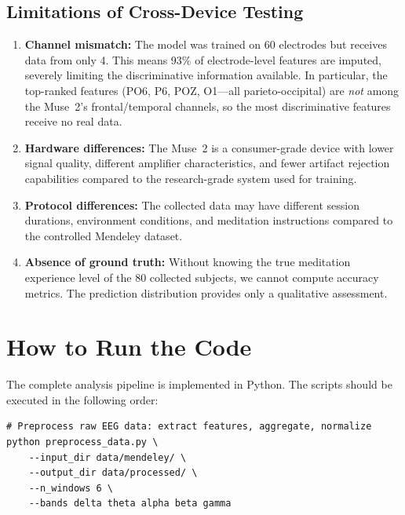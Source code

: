 \documentclass[12pt,a4paper]{article}
\begin{document}
\subsection{Limitations of Cross-Device Testing}

\begin{enumerate}
  \item \textbf{Channel mismatch:} The model was trained on 60 electrodes but receives data from only 4. This means 93\% of electrode-level features are imputed, severely limiting the discriminative information available. In particular, the top-ranked features (PO6, P6, POZ, O1---all parieto-occipital) are \emph{not} among the Muse~2's frontal/temporal channels, so the most discriminative features receive no real data.

  \item \textbf{Hardware differences:} The Muse~2 is a consumer-grade device with lower signal quality, different amplifier characteristics, and fewer artifact rejection capabilities compared to the research-grade system used for training.

  \item \textbf{Protocol differences:} The collected data may have different session durations, environment conditions, and meditation instructions compared to the controlled Mendeley dataset.

  \item \textbf{Absence of ground truth:} Without knowing the true meditation experience level of the 80 collected subjects, we cannot compute accuracy metrics. The prediction distribution provides only a qualitative assessment.
\end{enumerate}

\section{How to Run the Code}
\label{sec:howtorun}

The complete analysis pipeline is implemented in Python. The scripts should be executed in the following order:

\begin{lstlisting}[caption={Step 1: Data preprocessing},label={lst:preprocess}]
# Preprocess raw EEG data: extract features, aggregate, normalize
python preprocess_data.py \
    --input_dir data/mendeley/ \
    --output_dir data/processed/ \
    --n_windows 6 \
    --bands delta theta alpha beta gamma
\end{lstlisting}
\end{document}
